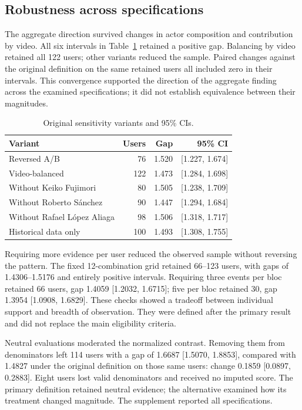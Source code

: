 \documentclass[conference,letterpaper]{IEEEtran}
\begin{document}
\subsection{Robustness across specifications}
The aggregate direction survived changes in actor composition and contribution by video. All six intervals in Table~\ref{tab:sensibilidades} retained a positive gap. Balancing by video retained all 122 users; other variants reduced the sample. Paired changes against the original definition on the same retained users all included zero in their intervals. This convergence supported the direction of the aggregate finding across the examined specifications; it did not establish equivalence between their magnitudes.
\begin{table}[t]\centering\small
\caption{Original sensitivity variants and 95\% CIs.}
\label{tab:sensibilidades}
\setlength{\tabcolsep}{3pt}
\begin{tabular}{lrrr}\toprule
Variant & Users & Gap & 95\% CI\\\midrule
Reversed A/B & 76 & 1.520 & [1.227, 1.674]\\
Video-balanced & 122 & 1.473 & [1.284, 1.698]\\
Without Keiko Fujimori & 80 & 1.505 & [1.238, 1.709]\\
Without Roberto Sánchez & 90 & 1.447 & [1.294, 1.684]\\
Without Rafael López Aliaga & 98 & 1.506 & [1.318, 1.717]\\
Historical data only & 100 & 1.493 & [1.308, 1.755]\\
\bottomrule\end{tabular}\end{table}

Requiring more evidence per user reduced the observed sample without reversing the pattern. The fixed 12-combination grid retained 66--123 users, with gaps of 1.4306--1.5176 and entirely positive intervals. Requiring three events per bloc retained 66 users, gap 1.4059 [1.2032, 1.6715]; five per bloc retained 30, gap 1.3954 [1.0908, 1.6829]. These checks showed a tradeoff between individual support and breadth of observation. They were defined after the primary result and did not replace the main eligibility criteria.

Neutral evaluations moderated the normalized contrast. Removing them from denominators left 114 users with a gap of 1.6687 [1.5070, 1.8853], compared with 1.4827 under the original definition on those same users: change 0.1859 [0.0897, 0.2883]. Eight users lost valid denominators and received no imputed score. The primary definition retained neutral evidence; the alternative examined how its treatment changed magnitude. The supplement reported all specifications.
\end{document}
